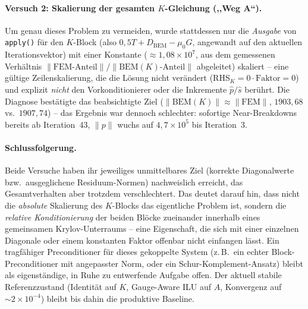 \documentclass[11pt,a4paper]{article}
\begin{document}
\paragraph{Versuch 2: Skalierung der gesamten $K$-Gleichung (,,Weg A``).} Um genau dieses Problem zu vermeiden, wurde stattdessen nur die \emph{Ausgabe} von \texttt{apply()} für den $K$-Block (also $0{,}5T + D_{\text{BEM}} - \mu_0 G$, angewandt auf den aktuellen Iterationsvektor) mit einer Konstante ($\approx 1{,}08\times 10^7$, aus dem gemessenen Verhältnis $\|\text{FEM-Anteil}\|/\|\text{BEM}(K)\text{-Anteil}\|$ abgeleitet) skaliert -- eine gültige Zeilenskalierung, die die Lösung nicht verändert (RHS$_K = 0 \cdot \text{Faktor} = 0$) und explizit \emph{nicht} den Vorkonditionierer oder die Inkremente $\hat p/\hat s$ berührt. Die Diagnose bestätigte das beabsichtigte Ziel ($\|\text{BEM}(K)\| \approx \|\text{FEM}\|$, $1903{,}68$ vs.\ $1907{,}74$) -- das Ergebnis war dennoch schlechter: sofortige Near-Breakdowns bereits ab Iteration~43, $\|p\|$ wuchs auf $4{,}7\times 10^5$ bis Iteration~3.

\paragraph{Schlussfolgerung.} Beide Versuche haben ihr jeweiliges unmittelbares Ziel (korrekte Diagonalwerte bzw.\ ausgeglichene Residuum-Normen) nachweislich erreicht, das Gesamtverhalten aber trotzdem verschlechtert. Das deutet darauf hin, dass nicht die \emph{absolute} Skalierung des $K$-Blocks das eigentliche Problem ist, sondern die \emph{relative Konditionierung} der beiden Blöcke zueinander innerhalb eines gemeinsamen Krylov-Unterraums -- eine Eigenschaft, die sich mit einer einzelnen Diagonale oder einem konstanten Faktor offenbar nicht einfangen lässt. Ein tragfähiger Preconditioner für dieses gekoppelte System (z.\,B.\ ein echter Block-Preconditioner mit angepasster Norm, oder ein Schur-Komplement-Ansatz) bleibt als eigenständige, in Ruhe zu entwerfende Aufgabe offen. Der aktuell stabile Referenzzustand (Identität auf $K$, Gauge-Aware ILU auf $A$, Konvergenz auf $\sim 2\times 10^{-4}$) bleibt bis dahin die produktive Baseline.
\end{document}
